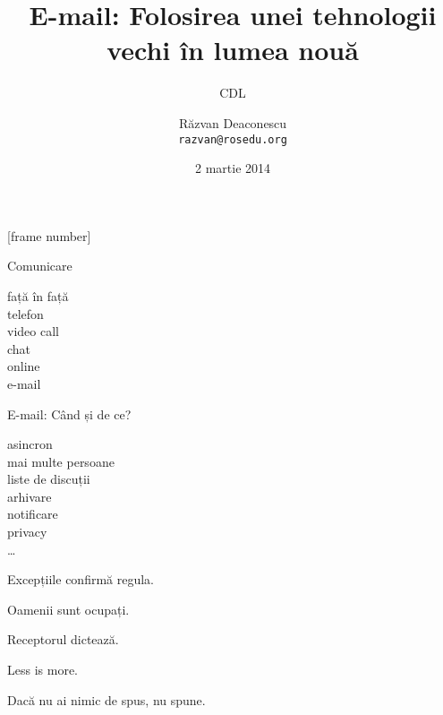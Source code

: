 \documentclass{beamer}
\title[E-mail]{E-mail: Folosirea unei tehnologii vechi în lumea nouă}
\subtitle{CDL}
\date{2 martie 2014}
\author[Răzvan]{Răzvan Deaconescu \\ \texttt{razvan@rosedu.org}}
\begin{document}
[frame number]

\frame{\titlepage}

\begin{frame}{Comunicare}
  \Large
  \begin{center}
    față în față \\
    telefon \\
    video call \\
    chat \\
    online \\
    e-mail
  \end{center}
\end{frame}

\begin{frame}{E-mail: Când și de ce?}
  \pause
  \Large
  \begin{center}
    asincron \\
    mai multe persoane \\
    liste de discuții \\
    arhivare \\
    notificare \\
    privacy \\
    \ldots
  \end{center}
\end{frame}

\begin{frame}{}
  \LARGE
  \begin{center}
    Excepțiile confirmă regula.
  \end{center}
\end{frame}

\begin{frame}{}
  \LARGE
  \begin{center}
    Oamenii sunt ocupați.
  \end{center}
\end{frame}

\begin{frame}{}
  \LARGE
  \begin{center}
    Receptorul dictează.
  \end{center}
\end{frame}

\begin{frame}{}
  \LARGE
  \begin{center}
    Less is more.
  \end{center}
\end{frame}

\begin{frame}{}
  \LARGE
  \begin{center}
    Dacă nu ai nimic de spus, nu spune.
  \end{center}
\end{frame}
\end{document}
